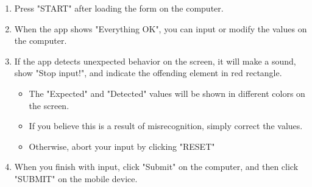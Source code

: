 { \ttfamily
\begin{enumerate}
	\item Press "START" after loading the form on the computer.

	\item When the app shows "Everything OK", you can input or modify the values on the computer.

	\item If the app detects unexpected behavior on the screen, it will make a sound, show "Stop input!", and indicate the offending element in red rectangle.
	\begin{itemize}
		\item The "Expected" and "Detected" values will be shown in different colors on the screen.
		\item If you believe this is a result of misrecognition, simply correct the values.
		\item Otherwise, abort your input by clicking "RESET"
	\end{itemize}

	\item When you finish with input, click "Submit" on the computer, and then click "SUBMIT" on the mobile device.
\end{enumerate}
}






